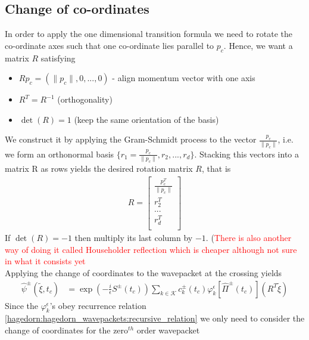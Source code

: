 \newtheorem{theorem}{Theorem}[section]
\newtheorem{corollary}{Corollary}[theorem]
\newtheorem{lemma}[theorem]{Lemma}
\usepackage{amsmath}


%
%
%
%
\subsection{Change of co-ordinates}
In order to apply the one dimensional transition formula we need to rotate the co-ordinate 
axes such that one co-ordinate lies parallel to $p_{c}$.
Hence, we want a matrix $R$ satisfying
\begin{itemize}
  \item $Rp_c = (\|p_c\|,0,...,0)$ - align momentum vector with one axis 
  \item $R^T = R^{-1}$ (orthogonality)
  \item $\det(R) = 1$ (keep the same orientation of the basis)
\end{itemize}
We construct it by applying the Gram-Schmidt process to the vector 
$\frac{p_c}{\| p_c \|}$, i.e. we form an orthonormal basis 
$\{r_1 = \frac{p_c}{\| p_c \|}, r_2, ..., r_d \}$. Stacking this vectors into 
a matrix R as rows yields the desired rotation matrix $R$, that is 
\begin{align}
  R =
  \begin{bmatrix}
    \frac{p_c^T}{\| p_c \|} \\
    r_2^T \\
    ... \\
    r_d^T \\
  \end{bmatrix}
\end{align}
If $\det(R) = -1$ then multiply its last column by $-1$.
(\textcolor{red}{There is also another way of doing it called Householder reflection
which is cheaper although not sure in what it consists yet} 
\\
Applying the change of coordinates to the wavepacket 
at the crossing yields
\begin{align}
  \hat{\psi}^{\pm}(\tilde{\xi},t_c) 
  &= 
  \exp{\left(-\frac{i}{\epsilon}S^{\pm}(t_c)\right)}
  \sum_{k \in \mathcal{K}} c_k^{\pm}(t_c) 
  \varphi_k^\epsilon[\hat{\Pi}^{\pm}(t_c)](R^{T}\tilde{\xi})
\end{align}
Since the $\varphi_k^{\epsilon}$'s obey recurrence relation 
\eqref{hagedorn:hagedorn_wavepackets:recursive_relation} we only need to consider 
the change of coordinates for the zero$^{th}$ order wavepacket 
